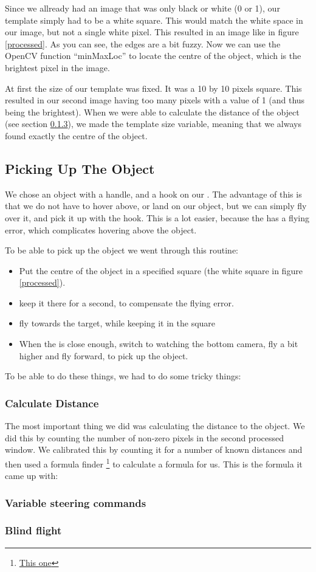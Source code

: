 Since we allready had an image that was only black or white (0 or 1), our template simply had to be a white square. This would match the white space in our image, but not a single white pixel. This resulted in an image like in figure \ref{processed}. As you can see, the edges are a bit fuzzy. Now we can use the OpenCV function ``minMaxLoc'' to locate the centre of the object, which is the brightest pixel in the image. 

At first the size of our template was fixed. It was a 10 by 10 pixels square. This resulted in our second image having too many pixels with a value of 1 (and thus being the brightest). When we were able to calculate the distance of the object (see section \ref{sec:pickingUp}), we made the template size variable, meaning that we always found exactly the centre of the object. 

\subsection{Picking Up The Object}
We chose an object with a handle, and a hook on our \Ardrone. The advantage of this is that we do not have to hover above, or land on our object, but we can simply fly over it, and pick it up with the hook. This is a lot easier, because the \Ardrone has a flying error, which complicates hovering above the object. 

To be able to pick up the object we went through this routine:
\begin{itemize}
\item Put the centre of the object in a specified square (the white square in figure \ref{processed}). 
\item keep it there for a second, to compensate the flying error.
\item fly towards the target, while keeping it in the square
\item When the \Ardrone is close enough, switch to watching the bottom camera, fly a bit higher and fly forward, to pick up the object.
\end{itemize}
To be able to do these things, we had to do some tricky things:
\subsubsection{Calculate Distance}
The most important thing we did was calculating the distance to the object. We
did this by counting the number of non-zero pixels in the second processed
window. We calibrated this by counting it for a number of known distances and
then used a formula finder \footnote{\href{}{This one}} to calculate a formula
for us. This is the formula it came up with:\\



\subsubsection{Variable steering commands}
\subsubsection{Blind flight}

\label{sec:pickingUp}

